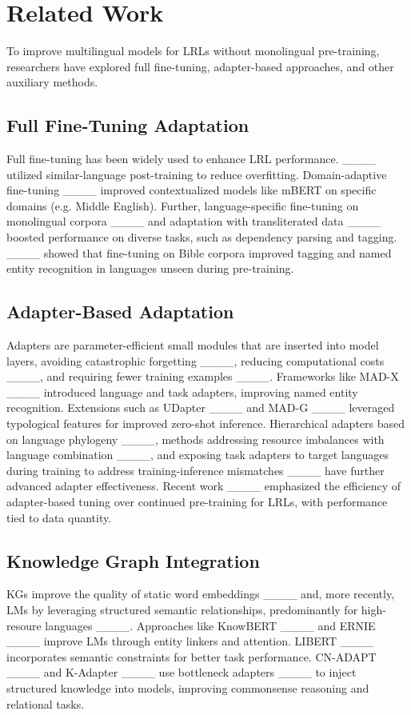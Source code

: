 \section{Related Work}
To improve multilingual models for LRLs without monolingual pre-training, researchers have explored full fine-tuning, adapter-based approaches, and other auxiliary methods.  

\subsection{Full Fine-Tuning Adaptation}  
Full fine-tuning has been widely used to enhance LRL performance. ____ utilized similar-language post-training to reduce overfitting. Domain-adaptive fine-tuning ____ improved contextualized models like mBERT on specific domains (e.g. Middle English). Further, language-specific fine-tuning on monolingual corpora ____ and adaptation with transliterated data ____ boosted performance on diverse tasks, such as dependency parsing and tagging. ____ showed that fine-tuning on Bible corpora improved tagging and named entity recognition in languages unseen during pre-training.  


\subsection{Adapter-Based Adaptation}  
Adapters are parameter-efficient small modules that are inserted into model layers, avoiding catastrophic forgetting ____, reducing computational costs ____, and requiring fewer training examples ____. Frameworks like MAD-X ____ introduced language and task adapters, improving named entity recognition. Extensions such as UDapter ____ and MAD-G ____ leveraged typological features for improved zero-shot inference. Hierarchical adapters based on language phylogeny ____, methods addressing resource imbalances with language combination ____, and exposing task adapters to target languages during training to address training-inference mismatches ____ have further advanced adapter effectiveness. Recent work ____ emphasized the efficiency of adapter-based tuning over continued pre-training for LRLs, with performance tied to data quantity.  

\subsection{Knowledge Graph Integration}  
KGs improve the quality of static word embeddings ____ and, more recently, LMs by leveraging structured semantic relationships, predominantly for high-resoure languages ____. Approaches like KnowBERT ____ and ERNIE ____ improve LMs through entity linkers and attention. LIBERT ____ incorporates semantic constraints for better task performance. CN-ADAPT ____ and K-Adapter ____ use bottleneck adapters ____ to inject structured knowledge into models, improving commonsense reasoning and relational tasks. %